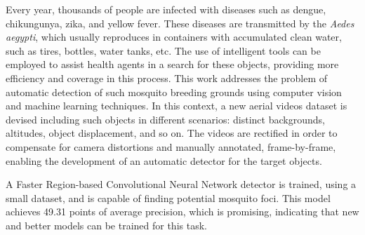 \begin{foreignabstract}

Every year, thousands of people are infected with diseases such as dengue, chikungunya, zika, and yellow fever.
These diseases are transmitted by the {\it Aedes aegypti}, which usually reproduces in containers with accumulated clean water, such as tires, bottles, water tanks, etc.
The use of intelligent tools can be employed to assist health agents in a search for these objects, providing more efficiency and coverage in this process.
This work addresses the problem of automatic detection of such mosquito breeding grounds using computer vision and machine learning techniques.
In this context, a new aerial videos dataset is devised including such objects in different scenarios: distinct backgrounds, altitudes, object displacement, and so on.
The videos are rectified in order to compensate for camera distortions and manually annotated, frame-by-frame, enabling the development of an automatic detector for the target objects.

A Faster Region-based Convolutional Neural Network detector is trained, using a small dataset, and is capable of finding potential mosquito foci.
This model achieves 49.31 points of average precision, which is promising, indicating that new and better models can be trained for this task.


\end{foreignabstract}


